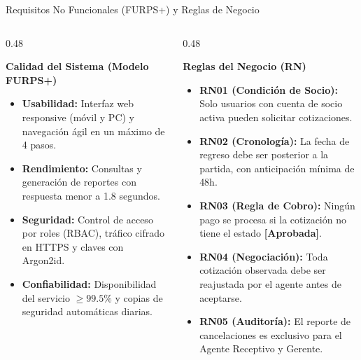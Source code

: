 \documentclass[aspectratio=169, 10pt]{beamer}
\begin{document}
\begin{frame}{Requisitos No Funcionales (FURPS+) y Reglas de Negocio}
    \begin{columns}[t]
        \begin{column}{0.48\textwidth}
            \begin{block}{\textbf{Calidad del Sistema (Modelo FURPS+)}}
                \scriptsize
                \begin{itemize}
                    \item \textbf{Usabilidad:} Interfaz web responsive (móvil y PC) y navegación ágil en un máximo de 4 pasos.
                    \item \textbf{Rendimiento:} Consultas y generación de reportes con respuesta menor a 1.8 segundos.
                    \item \textbf{Seguridad:} Control de acceso por roles (RBAC), tráfico cifrado en HTTPS y claves con Argon2id.
                    \item \textbf{Confiabilidad:} Disponibilidad del servicio $\ge 99.5\%$ y copias de seguridad automáticas diarias.
                \end{itemize}
            \end{block}
        \end{column}
        
        \begin{column}{0.48\textwidth}
            \begin{alertblock}{\textbf{Reglas del Negocio (RN)}}
                \scriptsize
                \begin{itemize}
                    \item \textbf{RN01 (Condición de Socio):} Solo usuarios con cuenta de socio activa pueden solicitar cotizaciones.
                    \item \textbf{RN02 (Cronología):} La fecha de regreso debe ser posterior a la partida, con anticipación mínima de 48h.
                    \item \textbf{RN03 (Regla de Cobro):} Ningún pago se procesa si la cotización no tiene el estado \textbf{[Aprobada]}.
                    \item \textbf{RN04 (Negociación):} Toda cotización observada debe ser reajustada por el agente antes de aceptarse.
                    \item \textbf{RN05 (Auditoría):} El reporte de cancelaciones es exclusivo para el Agente Receptivo y Gerente.
                \end{itemize}
            \end{alertblock}
        \end{column}
    \end{columns}
\end{frame}
\end{document}
